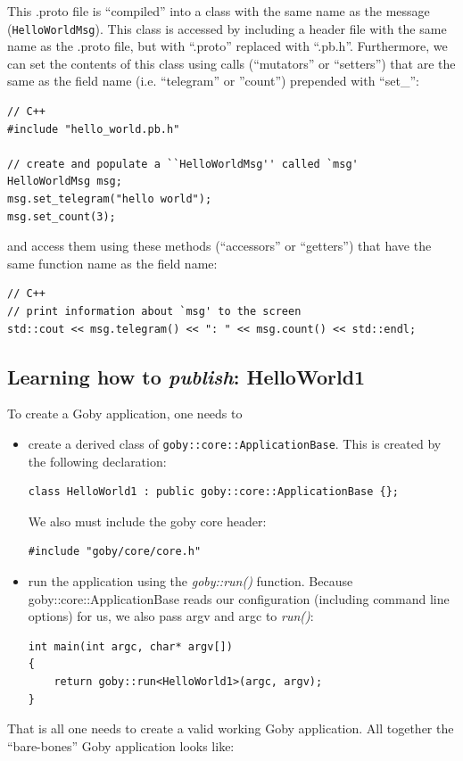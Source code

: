 \documentclass[11pt, letterpaper]{article}
\begin{document}
This .proto file is ``compiled'' into a class with the same name as the message (\texttt{HelloWorldMsg}). This class is accessed by including a header file with the same name as the .proto file, but with ``.proto'' replaced with ``.pb.h''. Furthermore, we can set the contents of this class using calls (``mutators'' or ``setters'') that are the same as the field name (i.e. ``telegram'' or ''count'') prepended with ``set\_'':
\begin{verbatim}
// C++ 
#include "hello_world.pb.h"

// create and populate a ``HelloWorldMsg'' called `msg'
HelloWorldMsg msg;
msg.set_telegram("hello world");
msg.set_count(3);
\end{verbatim}

and access them using these methods (``accessors'' or ``getters'') that have the same function name as the field name:

\begin{verbatim}
// C++ 
// print information about `msg' to the screen
std::cout << msg.telegram() << ": " << msg.count() << std::endl;
\end{verbatim}


\subsection{Learning how to \textit{publish}: HelloWorld1}

To create a Goby application, one needs to

\begin{itemize}
\item create a derived class of \texttt{goby::core::ApplicationBase}. This is created by the following declaration:
\begin{verbatim}
class HelloWorld1 : public goby::core::ApplicationBase {};
\end{verbatim}
We also must include the goby core header:
\begin{verbatim}
#include "goby/core/core.h"
\end{verbatim}
\item run the application using the \textit{goby::run()} function. Because goby::core::ApplicationBase reads our configuration (including command line options) for us, we also pass argv and argc to \textit{run()}:
\begin{verbatim}
int main(int argc, char* argv[])
{   
    return goby::run<HelloWorld1>(argc, argv);
}
\end{verbatim}
\end{itemize}
That is all one needs to create a valid working Goby application. All together the ``bare-bones'' Goby application looks like:
\end{document}
